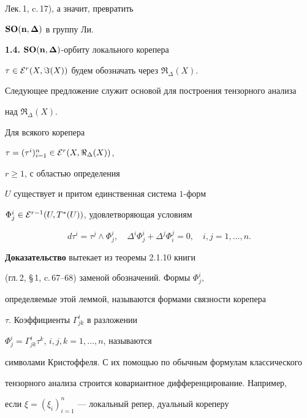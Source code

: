 Лек.\,1, c.\,17), а значит, превратить


$\bold{SO(n,\boldsymbol\Delta)}$ в группу Ли.


\medskip





{\bf 1.4.} $\bold{SO(n,\boldsymbol\Delta)}$-орбиту локального корепера


$\tau\in{\cal E}^r(X,\Im(X))$ будем обозначать через $\Re_{\Delta}(X)$.


Следующее предложение служит основой для построения тензорного анализа


над $\Re_{\Delta}(X)$.





\begin{lem}


Для всякого корепера


$\tau=(\tau^i)_{i=1}^n\in{\cal E}^r(X,\Re_{\Delta}(X))$,


$r\ge 1$, с областью определения


$U$ существует и притом единственная система $1$-форм


$\Phi^i_j\in{\cal E}^{r-1}(U,T^*(U))$, удовлетворяющая условиям


$$


d\tau^i=\tau^j\wedge \Phi^i_j,\quad \Delta^i\Phi^i_j+\Delta^j\Phi^j_i=0,


\quad i,j=1,\dotsc,n.


$$


\end{lem}





{\bf Доказательство} вытекает из теоремы 2.1.10 книги \cite{Wolf}


(гл.\,2, \S\,1, c.\,67--68) заменой обозначений. Формы $\Phi^i_j$,


определяемые этой леммой, называются формами связности корепера


$\tau$. Коэффициенты $\Gamma^i_{jk}$ в разложении


$\Phi^i_j= \Gamma^i_{jk}\tau^k$, $i,j,k=1,\dotsc,n$, называются


символами Кристоффеля. С их помощью по обычным формулам классического


тензорного анализа строится ковариантное дифференцирование. Например,


если $\xi=(\xi_i)_{i=1}^n$ --- локальный репер, дуальный кореперу


